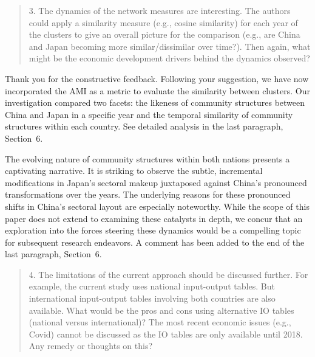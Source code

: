 \documentclass[12pt]{article}
\newcommand{\jy}[1]{\textcolor{red}{JY: #1}}
\newcommand{\tw}[1]{\textcolor{blue}{(TW: #1)}}
\newenvironment{comment}%
{\begin{quotation}\noindent\small\it\color{darkblue}\ignorespaces%
}{\end{quotation}}
\begin{document}
\begin{comment}
3. The dynamics of the network measures are interesting. The authors could
apply a similarity measure (e.g., cosine similarity) for each year of the
clusters to give an overall picture for the comparison (e.g., are China and
Japan becoming more similar/dissimilar over time?). Then again, what might
be the economic development drivers behind the dynamics observed? 
\end{comment}


Thank you for the constructive feedback. Following your suggestion, we have
now incorporated the AMI as a metric to evaluate the similarity between
clusters. Our investigation compared two facets: the likeness of community
structures between China and Japan in a specific year and the temporal
similarity of community structures within each country. See detailed analysis in
the last paragraph, Section~6.


The evolving nature of community structures within both nations
presents a captivating narrative. It is striking to observe the subtle,
incremental modifications in Japan's sectoral makeup juxtaposed against China's
pronounced transformations over the years. The underlying reasons for these
pronounced shifts in China's sectoral layout are especially noteworthy. While
the scope of this paper does not extend to examining these catalysts in depth,
we concur that an exploration into the forces steering these dynamics would be a
compelling topic for subsequent research endeavors. A comment has been added to
the end of the last paragraph, Section~6.


\begin{comment}
4. The limitations of the current approach should be discussed further. For
example, the current study uses national input-output tables. But
international input-output tables involving both countries are also
available. What would be the pros and cons using alternative IO tables
(national versus international)? The most recent economic issues (e.g.,
Covid) cannot be discussed as the IO tables are only available until 2018.
Any remedy or thoughts on this? 
\end{comment}

\end{document}
